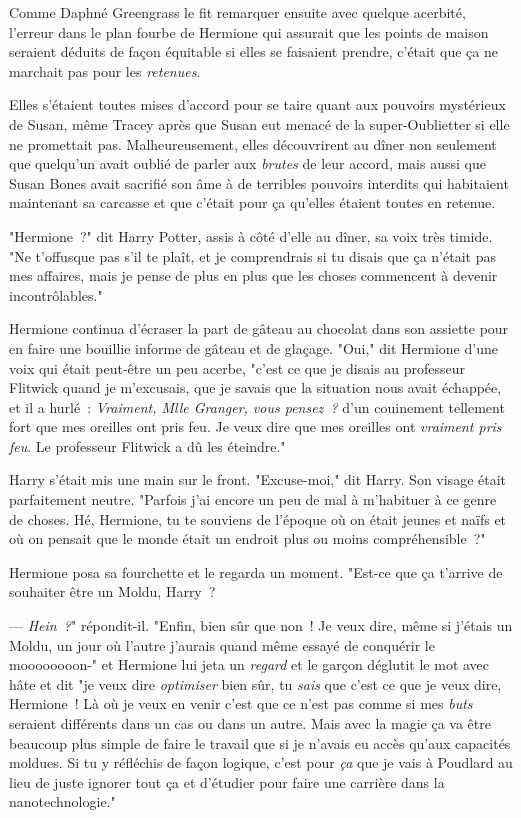 \later

Comme Daphné Greengrass le fit remarquer ensuite avec quelque acerbité, l'erreur dans le plan fourbe de Hermione qui assurait que les points de maison seraient déduits de façon équitable si elles se faisaient prendre, c'était que ça ne marchait pas pour les \emph{retenues}.

Elles s'étaient toutes mises d'accord pour se taire quant aux pouvoirs mystérieux de Susan, même Tracey après que Susan eut menacé de la super-Oublietter si elle ne promettait pas. Malheureusement, elles découvrirent au dîner non seulement que quelqu'un avait oublié de parler aux \emph{brutes} de leur accord, mais aussi que Susan Bones avait sacrifié son âme à de terribles pouvoirs interdits qui habitaient maintenant sa carcasse et que c'était pour ça qu'elles étaient toutes en retenue.

"Hermione~?" dit Harry Potter, assis à côté d'elle au dîner, sa voix très timide. "Ne t'offusque pas s'il te plaît, et je comprendrais si tu disais que ça n'était pas mes affaires, mais je pense de plus en plus que les choses commencent à devenir incontrôlables."

Hermione continua d'écraser la part de gâteau au chocolat dans son assiette pour en faire une bouillie informe de gâteau et de glaçage. "Oui," dit Hermione d'une voix qui était peut-être un peu acerbe, "c'est ce que je disais au professeur Flitwick quand je m'excusais, que je savais que la situation nous avait échappée, et il a hurlé~: \emph{Vraiment, Mlle Granger, vous pensez~?} d'un couinement tellement fort que mes oreilles ont pris feu. Je veux dire que mes oreilles ont \emph{vraiment pris feu}. Le professeur Flitwick a dû les éteindre."

Harry s'était mis une main sur le front. "Excuse-moi," dit Harry. Son visage était parfaitement neutre. "Parfois j'ai encore un peu de mal à m'habituer à ce genre de choses. Hé, Hermione, tu te souviens de l'époque où on était jeunes et naïfs et où on pensait que le monde était un endroit plus ou moins compréhensible~?"

Hermione posa sa fourchette et le regarda un moment. "Est-ce que ça t'arrive de souhaiter être un Moldu, Harry~?

--- \emph{Hein~?}" répondit-il. "Enfin, bien sûr que non~! Je veux dire, même si j'étais un Moldu, un jour où l'autre j'aurais quand même essayé de conquérir le moooooooon-" et Hermione lui jeta un \emph{regard} et le garçon déglutit le mot avec hâte et dit "je veux dire \emph{optimiser} bien sûr, tu \emph{sais} que c'est ce que je veux dire, Hermione~! Là où je veux en venir c'est que ce n'est pas comme si mes \emph{buts} seraient différents dans un cas ou dans un autre. Mais avec la magie ça va être beaucoup plus simple de faire le travail que si je n'avais eu accès qu'aux capacités moldues. Si tu y réfléchis de façon logique, c'est pour \emph{ça} que je vais à Poudlard au lieu de juste ignorer tout ça et d'étudier pour faire une carrière dans la nanotechnologie."

